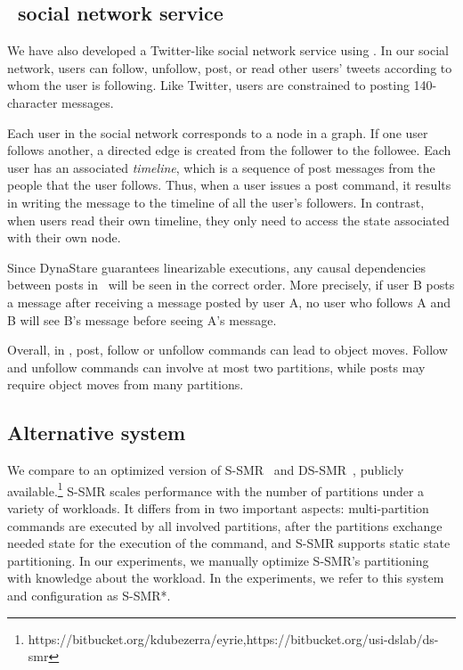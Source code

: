 \subsection{\appname\ social network service}
\label{sec:imp:\appname}

We have also developed a Twitter-like
social network service using \dynastar{}.  In our social
network, users can follow, unfollow, post, or read other users' tweets
according to whom the user is following. Like Twitter, users are
constrained to posting 140-character messages.

Each user in the social network corresponds to a node in a graph. If
one user follows another, a directed edge is created from the
follower to the followee. Each user has an associated \emph{timeline},
which is a sequence of post messages from the people that the user
follows. Thus, when a user issues a post command, it results in
writing the message to the timeline of all the user's followers.  In
contrast, when users read their own timeline, they only need
to access the state associated with their own node.

Since DynaStare guarantees linearizable executions, any causal dependencies between posts in \appname\ will be seen in the correct order. 
More precisely, if user B posts a message after receiving a message posted by user A, no user who follows A and B will see B's message before seeing A's message.

Overall, in \appname, post, follow or unfollow commands can lead to
object moves.  Follow and unfollow commands can involve at most two
partitions, while posts may require object moves from many partitions.



\subsection{Alternative system}

We compare \dynastar{} to an optimized version of S-SMR~\cite{bezerra2014ssmr} and DS-SMR~\cite{hoang2016}, publicly available.\footnote{https://bitbucket.org/kdubezerra/eyrie,https://bitbucket.org/usi-dslab/ds-smr}
S-SMR scales performance with the number of partitions under a variety of workloads.
It differs from \dynastar{} in two important aspects:
multi-partition commands are executed by all involved partitions, after the partitions exchange needed state for the execution of the command, and S-SMR supports static state partitioning.
In our experiments, we manually optimize S-SMR's partitioning with knowledge about the workload.
In the experiments, we refer to this system and configuration as S-SMR*.

